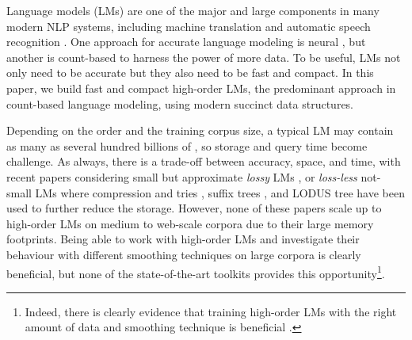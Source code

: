 Language models (LMs) are one of the major and large components in many modern NLP systems, including machine translation \cite{koehn2010book} 
and automatic speech recognition \cite{rab93book}.
%
One approach for accurate language modeling is neural 
\cite{Bengio:2003:NPL,DBLP:conf/interspeech/MikolovKBCK10}, but another is  count-based 
\cite{chen1996empirical} to harness the power of more data.
%
%
To be useful, LMs not only need to be accurate but they also need to be fast and compact.
%
In this paper, we build  fast and compact high-order \ngram LMs, the predominant approach in 
count-based language modeling, using modern succinct data structures.

%
%



Depending on the order and the training corpus size, a typical \ngram LM may contain as many as several hundred billions of \ngrams \cite{brants2007large},
so storage and query time become challenge.
%
As always, there is a trade-off between accuracy, space, and time, with recent papers considering small but approximate  \emph{lossy} LMs 
\cite{Chazelle:2004:BFE:982792.982797,guthrie2010storing},
or \emph{loss-less}  not-small LMs \cite{stolcke2011srilm} where compression and tries 
\cite{Germann:2009:TPT:1621947.1621952, heafield2011kenlm, pauls2011faster}, 
suffix trees \cite{kennington2012suffix}, and LODUS tree \cite{sall11,DBLP:conf/acl/WatanabeTI09}  
have been used to further reduce the storage.
% 
However, none of these papers scale up to high-order  
\ngram LMs on medium to web-scale corpora due to their large  memory footprints.
%
% 
Being able to work with high-order  LMs and investigate their behaviour 
with different smoothing techniques on large corpora is clearly beneficial, but none of the
state-of-the-art toolkits provides this opportunity\footnote{
Indeed, there is clearly evidence that training high-order \ngram
LMs with the right amount of data and smoothing technique is beneficial \cite{wood2011sequence}.
}. 

